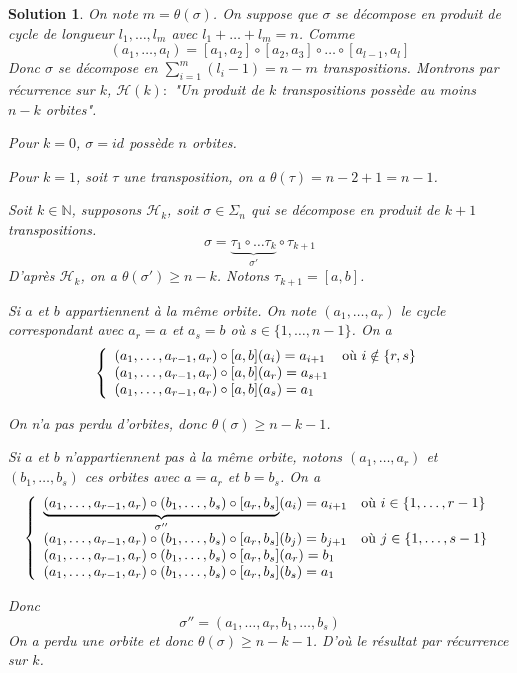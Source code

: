 \documentclass[12pt]{article}
\newtheorem{solution}{Solution}[section]
\theoremstyle{remark}
\newcommand{\N}{\mathbb{N}} \newcommand{\Z}{\mathbb{Z}}
\numberwithin{equation}{section}
\begin{document}
\begin{solution}
	On note $m=\theta(\sigma)$. On suppose que $\sigma$ se décompose en produit de cycle de longueur $l_{1},\dots,l_{m}$ avec $l_{1}+\dots+l_{m}=n$. Comme
	$$(a_{1},\dots,a_{l})=[a_{1},a_{2}]\circ[a_{2},a_{3}]\circ\dots\circ[a_{l-1},a_{l}]$$
	Donc $\sigma$ se décompose en $\sum_{i=1}^{m}(l_{i}-1)=n-m$ transpositions. Montrons par récurrence sur $k$, $\mathcal{H}(k)\colon$ "Un produit de $k$ transpositions possède au moins $n-k$ orbites".

	Pour $k=0$, $\sigma=id$ possède $n$ orbites.

	Pour $k=1$, soit $\tau$ une transposition, on a $\theta(\tau)=n-2+1=n-1$.

	Soit $k\in\N$, supposons $\mathcal{H}_{k}$, soit $\sigma\in\Sigma_{n}$ qui se décompose en produit de $k+1$ transpositions.
	$$\sigma=\underbrace{\tau_{1}\circ\dots\tau_{k}}_{\sigma'}\circ\tau_{k+1}$$
	D'après $\mathcal{H}_{k}$, on a $\theta(\sigma')\geqslant n-k$. Notons $\tau_{k+1}=[a,b]$. 
	
	Si $a$ et $b$ appartiennent à la même orbite. On note $(a_{1},\dots,a_{r})$ le cycle correspondant avec $a_{r}=a$ et $a_{s}=b$ où $s\in\{1,\dots,n-1\}$. On a 
	$$
	\left\{
		\begin{array}[]{ll}
			(a_{1},\dots,a_{r-1},a_{r})\circ[a,b](a_{i})=a_{i+1} &\text{où }i\notin\{r,s\}\\
			(a_{1},\dots,a_{r-1},a_{r})\circ[a,b](a_{r})=a_{s+1}&\\
			(a_{1},\dots,a_{r-1},a_{r})\circ[a,b](a_{s})=a_{1}&
		\end{array}
	\right.
	$$

	On n'a pas perdu d'orbites, donc $\theta(\sigma)\geqslant n-k-1$. 

	Si $a$ et $b$ n'appartiennent pas à la même orbite, notons $(a_{1},\dots,a_{r})$ et $(b_{1},\dots,b_{s})$ ces orbites avec $a=a_{r}$ et $b=b_{s}$. On a 
	$$
	\left\{
		\begin{array}[]{ll}
			\underbrace{(a_{1},\dots,a_{r-1},a_{r})\circ(b_{1},\dots,b_{s})\circ[a_{r},b_{s}]}_{\sigma''}(a_{i})=a_{i+1} &\text{où }i\in\{1,\dots,r-1\}\\
			(a_{1},\dots,a_{r-1},a_{r})\circ(b_{1},\dots,b_{s})\circ[a_{r},b_{s}](b_{j})=b_{j+1} &\text{où }j\in\{1,\dots,s-1\}\\
			(a_{1},\dots,a_{r-1},a_{r})\circ(b_{1},\dots,b_{s})\circ[a_{r},b_{s}](a_{r})=b_{1}&\\
			(a_{1},\dots,a_{r-1},a_{r})\circ(b_{1},\dots,b_{s})\circ[a_{r},b_{s}](b_{s})=a_{1}&
		\end{array}
	\right.
	$$

	Donc 
	$$\sigma''=(a_{1},\dots,a_{r},b_{1},\dots,b_{s})$$
	On a perdu une orbite et donc $\theta(\sigma)\geqslant n-k-1$. D'où le résultat par récurrence sur $k$.
\end{solution}
\end{document}
